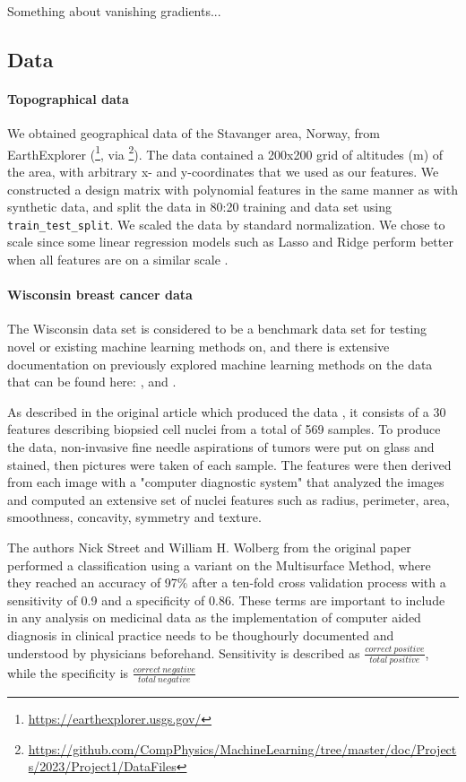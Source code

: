 Something about vanishing gradients...


\subsection{Data}\label{ssec:data}
%
\paragraph*{Topographical data}
We obtained geographical data of the Stavanger area, Norway, from EarthExplorer (\footnote{\url{https://earthexplorer.usgs.gov/}}, 
via \footnote{\url{https://github.com/CompPhysics/MachineLearning/tree/master/doc/Projects/2023/Project1/DataFiles}}). 
The data contained a 200x200 grid of altitudes (m) of the area, with arbitrary x- and y-coordinates that we used as our features. 
We constructed a design matrix with polynomial features in the same manner as with synthetic data, and split the data in 80:20 training 
and data set using \texttt{train\_test\_split}. We scaled the data by standard normalization. We chose to scale since some linear regression 
models such as Lasso and Ridge perform better when all features are on a similar scale \supercite{raschka2019}. 
\\
\paragraph*{Wisconsin breast cancer data}
The Wisconsin data set \cite{bc_wisconsin} is considered to be a benchmark data set for testing novel or existing machine learning methods on, and 
there is extensive documentation on previously explored machine learning methods on the data that can be found here: 
\cite{wisconsin_example1}, \cite{wisconsin_example2} and \cite{wisconsin_example3}.

As described in the original article which produced the data \cite{first_wisconsin}, it consists of a 30 features describing biopsied cell nuclei from 
a total of 569 samples. To produce the data, non-invasive fine needle aspirations of tumors were put on glass and stained, 
then pictures were taken of each sample. The features were then derived from each image with a "computer diagnostic system" that 
analyzed the images and computed an extensive set of nuclei features such as radius, perimeter, area, smoothness, concavity, symmetry and texture. 

The authors Nick Street and William H. Wolberg from the original paper performed a classification using a variant on the Multisurface 
Method, where they reached an accuracy of 97$\%$ after a ten-fold cross validation process with a sensitivity of 0.9 and a specificity of 0.86. 
These terms are important to include in any analysis on medicinal data as the implementation of computer aided diagnosis in clinical practice 
needs to be thoughourly documented and understood by physicians beforehand. Sensitivity is described as $\frac{correct\ positive}{total\ positive}$, 
while the specificity is $\frac{correct\ negative}{total\ negative}$
%

